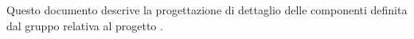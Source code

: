 Questo documento descrive la progettazione di dettaglio delle componenti definita dal gruppo \gruppo relativa al progetto \progetto.